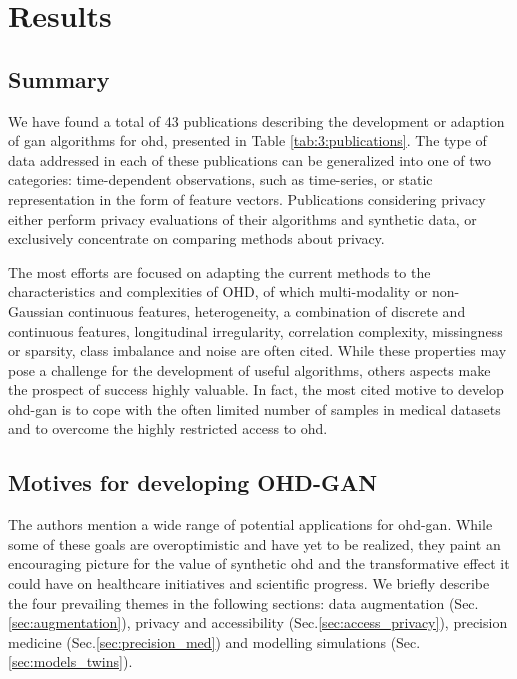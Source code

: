 \section{Results}
    \subsection{Summary}
        We have found a total of 43 publications describing the development or adaption of \gls{gan} algorithms for \gls{ohd}, presented in Table \ref{tab:3:publications}. The type of data addressed in each of these publications can be generalized into one of two categories: time-dependent observations, such as time-series, or static representation in the form of feature vectors. Publications considering privacy either perform privacy evaluations of their algorithms and synthetic data, or exclusively concentrate on comparing methods about privacy.
        
        The most efforts are focused on adapting the current methods to the characteristics and complexities of OHD, of which multi-modality or non-Gaussian continuous features, heterogeneity, a combination of discrete and continuous features, longitudinal irregularity, correlation complexity, missingness or sparsity, class imbalance and noise are often cited. While these properties may pose a challenge for the development of useful algorithms, others aspects make the prospect of success highly valuable. In fact, the most cited motive to develop \gls{ohd-gan} is to cope with the often limited number of samples in medical datasets and to overcome the highly restricted access to \gls{ohd}.\par
        
    \subsection{Motives for developing OHD-GAN}
        The authors mention a wide range of potential applications for \gls{ohd-gan}. While some of these goals are overoptimistic and have yet to be realized, they paint an encouraging picture for the value of synthetic \gls{ohd} and the transformative effect it could have on healthcare initiatives and scientific progress. We briefly describe the four prevailing themes in the following sections: data augmentation (Sec.\ref{sec:augmentation}), privacy and accessibility (Sec.\ref{sec:access_privacy}), precision medicine (Sec.\ref{sec:precision_med}) and  modelling simulations (Sec.\ref{sec:models_twins}). 

